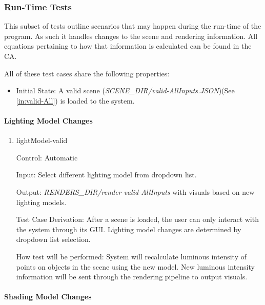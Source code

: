 \documentclass[12pt, titlepage]{article}
\begin{document}
\subsubsection{Run-Time Tests}
This subset of tests outline scenarios that may happen during the run-time of 
the program. As such it handles changes to the scene and rendering information. 
All equations pertaining to how that information is calculated can be found in 
the CA.

All of these test cases share the following properties:
\begin{itemize}
	\item[] Initial State: A valid scene 
	(\textit{SCENE\_DIR/valid-AllInputs.JSON})(See \ref{in:valid-All}) is 
	loaded to the system.
\end{itemize}

\paragraph{Lighting Model Changes}

\begin{enumerate}
	
	\item{lightModel-valid\\}
	
	Control: Automatic
	
	Input: Select different lighting model from dropdown list.
	
	Output: \textit{RENDERS\_DIR/render-valid-AllInputs} with visuals based on 
	new lighting models.
	
	Test Case Derivation: After a scene is loaded, the user can only interact 
	with the system through its GUI. Lighting model changes are determined by 
	dropdown list selection.
	
	How test will be performed: System will recalculate luminous intensity of 
	points on objects in the scene using the new model. New luminous intensity 
	information will be sent through the rendering pipeline to output visuals.
	
\end{enumerate}

\paragraph{Shading Model Changes}
\end{document}
